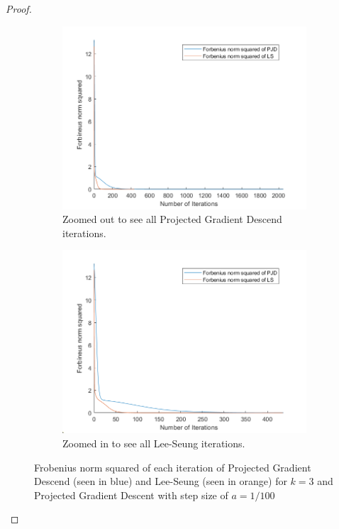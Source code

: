 \documentclass[12pt]{report}
\begin{document}
\begin{problem}
\begin{proof}
\begin{figure}[H]
    \begin{subfigure}[b]{0.5\linewidth}
        \centering
        \includegraphics[width=\linewidth]{images/k3l.png}
        \caption{Zoomed out to see all Projected Gradient Descend iterations.}
        \label{fig1:a}
        \vspace{4ex}
    \end{subfigure}%
    \begin{subfigure}[b]{0.5\linewidth}
        \centering
        \includegraphics[width=\linewidth]{images/k3s.png}
        \caption{Zoomed in to see all Lee-Seung iterations.}
        \label{fig1:b}
        \vspace{4ex}
    \end{subfigure}
    \caption{Frobenius norm squared of each iteration of Projected Gradient Descend (seen in blue) and Lee-Seung (seen in orange) for $k=3$ and Projected Gradient Descent with step size of $a=1/100$}
    \label{fig1}
\end{figure}


\end{proof}
\end{problem}
\end{document}
